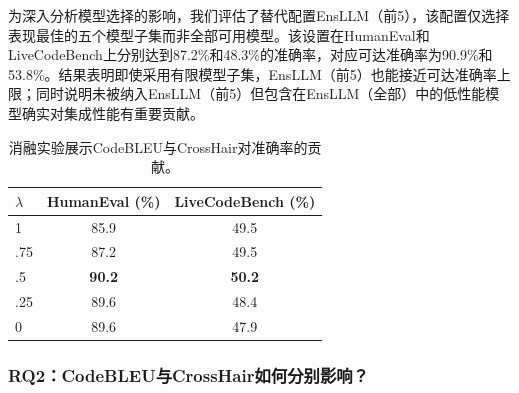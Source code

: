 \documentclass{article}
\newcommand{\tool}{EnsLLM}
\begin{document}
为深入分析模型选择的影响，我们评估了替代配置\tool（前5），该配置仅选择表现最佳的五个模型子集而非全部可用模型。该设置在HumanEval和LiveCodeBench上分别达到87.2\%和48.3\%的准确率，对应可达准确率为90.9\%和53.8\%。结果表明即使采用有限模型子集，EnsLLM（前5）也能接近可达准确率上限；同时说明未被纳入\tool（前5）但包含在\tool（全部）中的低性能模型确实对集成性能有重要贡献。
\begin{table}[t!]
    \centering
    \caption{消融实验展示CodeBLEU与CrossHair对准确率的贡献。}
    \label{tab:ablation_codebleu_crosshair}
    \begin{tabular}{|l|c|c|}
        \hline
        \textbf{$\lambda$} & \textbf{HumanEval (\%)} & \textbf{LiveCodeBench (\%)} \\
        \hline
        1 & 85.9 & 49.5 \\
        .75 & 87.2 & 49.5 \\
        .5 & \textbf{90.2} & \textbf{50.2} \\
        .25 & 89.6 & 48.4 \\
        0 & 89.6 & 47.9 \\
        \hline
    \end{tabular}
\end{table}
\begin{table}[t!]
    \centering
    \caption{不同CodeBLEU权重配置对准确率的影响。}
    \label{tab:codebleu_variants}
\end{table}
\subsubsection{RQ2：CodeBLEU与CrossHair如何分别影响？}
\end{document}
